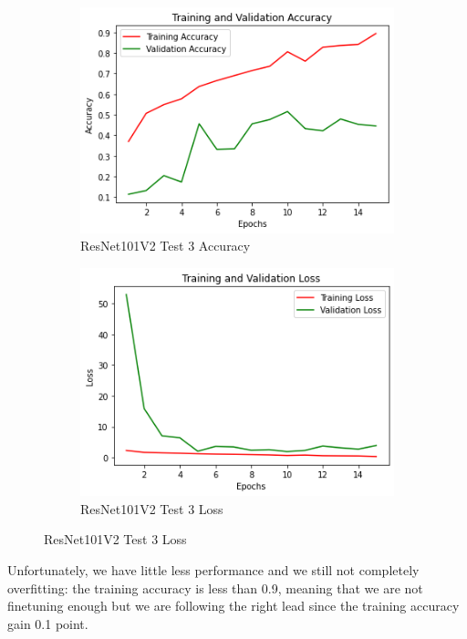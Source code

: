 \begin{figure}[H]
	\begin{subfigure}{0.5\textwidth}
		\includegraphics[width=0.9\linewidth]{img/resnet101v2/resnet101ft_block5_acc.png} 
		\caption{ResNet101V2 Test 3 Accuracy}
		\label{fig:resnet101ftblock5acc}
	\end{subfigure}
	\begin{subfigure}{0.5\textwidth}
		\includegraphics[width=0.9\linewidth]{img/resnet101v2/resnet101ft_block5_loss.png}
		\caption{ResNet101V2 Test 3 Loss}
		\label{fig:resnet101ftblock5loss}
	\end{subfigure}
\end{figure}

Unfortunately, we have little less performance and we still not completely overfitting: the training accuracy is less than 0.9, meaning that we are not finetuning enough but we are following the right lead since the training accuracy gain 0.1 point.


